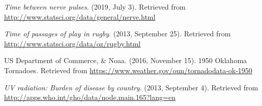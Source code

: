 \documentclass[]{book}
\begin{document}
\emph{Time between nerve pulses}. (2019, July 3). Retrieved from
\url{http://www.statsci.org/data/general/nerve.html}

\emph{Time of passages of play in rugby}. (2013, September 25). Retrieved
from \url{http://www.statsci.org/data/oz/rugby.html}

US Department of Commerce, \& Noaa. (2016, November 15). 1950 Oklahoma Tornadoes. Retrieved from \url{https://www.weather.gov/oun/tornadodata-ok-1950}

\emph{UV radiation: Burden of disease by country}. (2013, September 4).
Retrieved from \url{http://apps.who.int/gho/data/node.main.165?lang=en}


\end{document}
